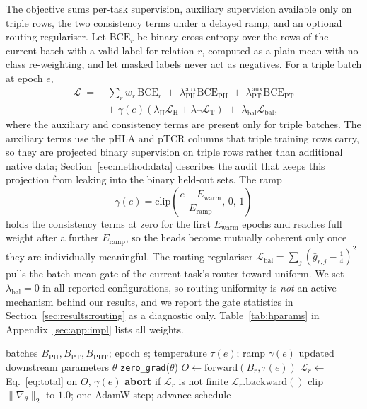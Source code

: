 \documentclass[webpdf,modern,large,namedate]{oup-authoring-template}
\theoremstyle{thmstyleone}
\theoremstyle{thmstyletwo}
\theoremstyle{thmstylethree}
\newcommand{\method}{UniReMoE}
\newcommand{\PH}{pHLA}
\newcommand{\PT}{pTCR}
\newcommand{\PHm}{\mathrm{PH}}
\newcommand{\PTm}{\mathrm{PT}}
\newcommand{\PHTm}{\mathrm{PHT}}
\begin{document}
The objective sums per-task supervision, auxiliary supervision available only
on triple rows, the two consistency terms under a delayed ramp, and an optional
routing regulariser. Let $\mathrm{BCE}_r$ be binary cross-entropy over the rows
of the current batch with a valid label for relation $r$, computed as a plain
mean with no class re-weighting, and let masked labels never act as negatives.
For a triple batch at epoch $e$,
\begin{equation}
\begin{aligned}
\mathcal{L} \;=\;{} & \sum_{r} w_r\,\mathrm{BCE}_r
\;+\;\lambda^{\mathrm{aux}}_{\PHm}\mathrm{BCE}_{\PHm}
\;+\;\lambda^{\mathrm{aux}}_{\PTm}\mathrm{BCE}_{\PTm}\\
&+\;\gamma(e)\left(\lambda_{\mathrm{H}}\mathcal{L}_{\mathrm{H}}
+\lambda_{\mathrm{T}}\mathcal{L}_{\mathrm{T}}\right)
\;+\;\lambda_{\mathrm{bal}}\mathcal{L}_{\mathrm{bal}},
\end{aligned}
\label{eq:total}
\end{equation}
where the auxiliary and consistency terms are present only for triple batches.
The auxiliary terms use the \PH{} and \PT{} columns that triple training rows
carry, so they are projected binary supervision on triple rows rather than
additional native data; Section~\ref{sec:method:data} describes the audit that
keeps this projection from leaking into the binary held-out sets. The ramp
\begin{equation}
\gamma(e)=\mathrm{clip}\!\left(\frac{e-E_{\mathrm{warm}}}
{E_{\mathrm{ramp}}},\,0,\,1\right)
\label{eq:ramp}
\end{equation}
holds the consistency terms at zero for the first $E_{\mathrm{warm}}$ epochs
and reaches full weight after a further $E_{\mathrm{ramp}}$, so the heads
become mutually coherent only once they are individually meaningful. The
routing regulariser $\mathcal{L}_{\mathrm{bal}}=\sum_j(\bar g_{r,j}-\tfrac14)^2$
pulls the batch-mean gate of the current task's router toward uniform. We set
$\lambda_{\mathrm{bal}}=0$ in all reported configurations, so routing
uniformity is \emph{not} an active mechanism behind our results, and we report
the gate statistics in Section~\ref{sec:results:routing} as a diagnostic only.
Table~\ref{tab:hparams} in Appendix~\ref{sec:app:impl} lists all weights.

\begin{algorithm}[!t]
\caption{One \method{} optimisation step in joint mode.}\label{alg:train}
\begin{algorithmic}[1]
\Require batches $B_{\PHm},B_{\PTm},B_{\PHTm}$; epoch $e$; temperature
$\tau(e)$; ramp $\gamma(e)$
\Ensure updated downstream parameters $\theta$
\State \texttt{zero\_grad}($\theta$)
\For{$r \in (\PHm,\PTm,\PHTm)$}
  \State $O \gets \mathrm{forward}(B_r, \tau(e))$
         \Comment{all three logits when $r=\PHTm$}
  \State $\mathcal{L}_r \gets$ Eq.~\eqref{eq:total} on $O$, $\gamma(e)$
  \State \textbf{abort} if $\mathcal{L}_r$ is not finite
  \State $\mathcal{L}_r.\mathrm{backward}()$ 
\EndFor
\State clip $\|\nabla_\theta\|_2$ to $1.0$; one AdamW step; advance schedule
\end{algorithmic}
\end{algorithm}
\end{document}
